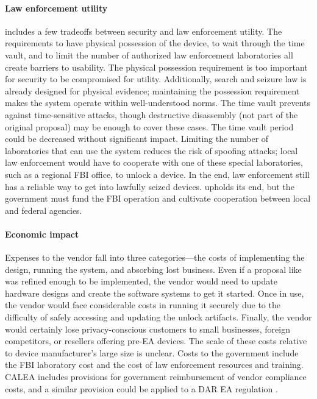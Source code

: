 \paragraph*{Law enforcement utility} \ldawmsr includes a few tradeoffs between security and law enforcement utility. The
requirements to have physical possession of the device, to wait through the time vault, and to limit the number of
authorized law enforcement laboratories all create barriers to usability. The physical possession requirement is too
important for security to be compromised for utility. Additionally, search and seizure law is already designed for
physical evidence; maintaining the possession requirement makes the system operate within well-understood norms. The
time vault prevents against time-sensitive attacks, though destructive disassembly (not part of the original proposal)
may be enough to cover these cases. The time vault period could be decreased without significant impact. Limiting the
number of laboratories that can use the system reduces the risk of spoofing attacks; local law enforcement would have to
cooperate with one of these special laboratories, such as a regional \ac{FBI} office, to unlock a device. In the end,
law enforcement still has a reliable way to get into lawfully seized devices. \ldawmsr upholds its end, but the
government must fund the \ac{FBI} operation and cultivate cooperation between local and federal agencies.

\paragraph*{Economic impact} Expenses to the vendor fall into three categories---the costs of implementing the design,
running the system, and absorbing lost business. Even if a proposal like \ldawmsr was refined enough to be implemented,
the vendor would need to update hardware designs and create the software systems to get it started. Once in use, the
vendor would face considerable costs in running it securely due to the difficulty of safely accessing and updating the
unlock artifacts. Finally, the vendor would certainly lose privacy-conscious customers to small businesses, foreign
competitors, or resellers offering pre-\ac{EA} devices. The scale of these costs relative to device manufacturer's large
size is unclear. Costs to the government include the \ac{FBI} laboratory cost and the cost of law enforcement resources
and training. \acs{CALEA} includes provisions for government reimbursement of vendor compliance costs, and a similar
provision could be applied to a \ac{DAR} \ac{EA} regulation \cite{edwards_hr4922_1994}.
